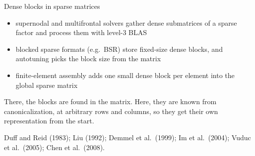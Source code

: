 \documentclass[10pt,mathserif,aspectratio=169]{beamer}
\newcommand{\bul}{\setlength\itemsep{1.1ex}}
\begin{document}
\begin{frame}[label=bk-denseblocks]{Dense blocks in sparse matrices}
\vspace{-0.5ex}
\begin{itemize}\small\bul
  \item supernodal and multifrontal solvers gather dense submatrices of a sparse factor and
        process them with level-3 BLAS
  \item blocked sparse formats (e.g.\ BSR) store fixed-size dense blocks, and autotuning picks
        the block size from the matrix
  \item finite-element assembly adds one small dense block per element into the global sparse
        matrix
\end{itemize}

\vspace{2ex}
\begin{center}\small\color{polyblue}
There, the blocks are found in the matrix. Here, they are known from canonicalization, at
arbitrary rows and columns, so they get their own representation from the start.
\end{center}

\vfill
{\scriptsize\color{black!55} Duff and Reid (1983); Liu (1992); Demmel et al.\ (1999); Im et
al.\ (2004); Vuduc et al.\ (2005); Chen et al.\ (2008).}
\end{frame}
\end{document}
